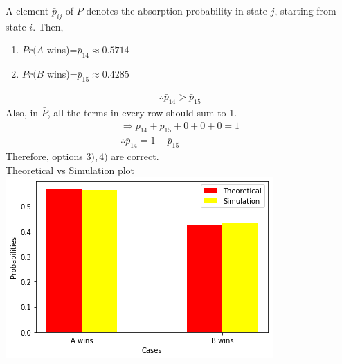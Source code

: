 \documentclass[journal,12pt,twocolumn]{IEEEtran}
\begin{document}
A element $\bar p_{ij}$ of $\bar P$ denotes the absorption probability in state $j$, starting from state $i$. Then,
\begin{enumerate}
    \item $Pr(A$ wins)=$\bar p_{14}\approx0.5714$
    \item $Pr(B$ wins)=$\bar p_{15}\approx0.4285$
\end{enumerate}
\begin{align}
\tag{104.9}
\therefore \bar p_{14} > \bar p_{15}
\end{align}
Also, in $\bar P$, all the terms in every row should sum to 1.
\begin{align}
\tag{104.10}
\Rightarrow \bar p_{14} + \bar p_{15}+ 0+0+0=1\\
\tag{104.11}
\therefore \bar p_{14}=1-\bar p_{15}
\end{align}
Therefore, options $3),4)$ are correct.\\

Theoretical vs Simulation plot
\centering
\includegraphics[scale=0.65]{Assignment8.png}
\end{document}
